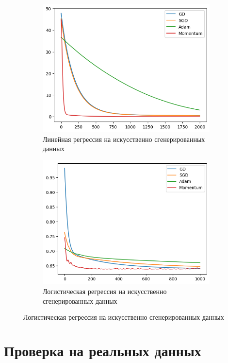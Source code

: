 \documentclass{article}
\begin{document}
\begin{figure}[h]
  \begin{subfigure}{.5\textwidth}
  \centering
    \includegraphics[width=0.9\linewidth]{lin_art.png}
    \caption{Линейная регрессия на искусственно сгенерированных данных}
    \label{lin_art}
  \end{subfigure}%
  \begin{subfigure}{.5\textwidth}
  \centering
    \includegraphics[width=0.9\linewidth]{log_art.png}
    \caption{Логистическая регрессия на искусственно сгенерированных данных}
    \label{log_art}
  \end{subfigure}
\end{figure}

\section*{Проверка на реальных данных}
\end{document}
